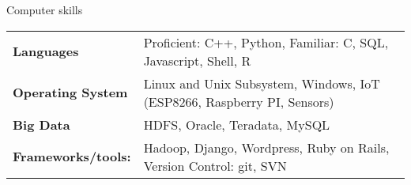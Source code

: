 \documentclass{resume} %
\begin{document}
\vspace{-1cm}
\begin{rSection}{Computer skills}
\vspace{-0.2cm}
\begin{multicols}{2}
    \noindent
        \begin{tabular}{ p{4.2cm} l}
        \bf{Languages} & Proficient: C++, Python, Familiar: C, SQL, Javascript, Shell, R \\
        \bf{Operating System} & Linux and Unix Subsystem, Windows, IoT (ESP8266, Raspberry PI, Sensors) \\ 
        \bf{Big Data} &  HDFS, Oracle, Teradata, MySQL \\
        \bf{Frameworks/tools:} & Hadoop, Django, Wordpress, Ruby on Rails, Version Control: git, SVN 
        \end{tabular}
    \end{multicols}
\end{rSection}




\end{document}
